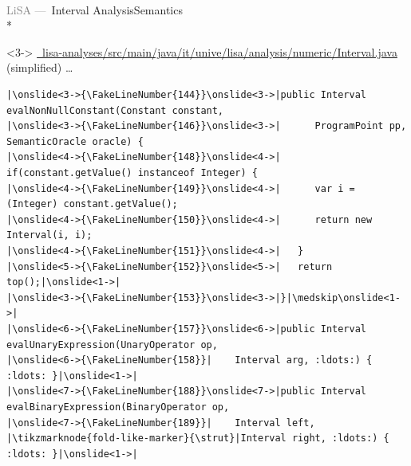 \begin{frame}[fragile]{\textcolor{gray}{LiSA ---~}Interval Analysis\textsuperscript{\color{gray}\smaller[2]\cite[p.\,389]{cousout2021principles}}\hfill Semantics}
\\*
\begin{uncoverenv}<3->
{\scriptsize\color{gray}\href{https://github.com/lisa-analyzer/lisa/blob/bd00779ab87e1cd31ed01b97d9b0e71b922f5bcf/lisa/lisa-analyses/src/main/java/it/unive/lisa/analysis/numeric/Interval.java}{\hbox{\faFileCodeO~}lisa-analyses/src/main/java/it/unive/lisa/analysis/numeric/Interval.java} (simplified)}
\preto\ldots{\color{lightgray}}%
\begin{verbatim}
|\onslide<3->{\FakeLineNumber{144}}\onslide<3->|public Interval evalNonNullConstant(Constant constant,
|\onslide<3->{\FakeLineNumber{146}}\onslide<3->|      ProgramPoint pp, SemanticOracle oracle) {
|\onslide<4->{\FakeLineNumber{148}}\onslide<4->|   if(constant.getValue() instanceof Integer) {
|\onslide<4->{\FakeLineNumber{149}}\onslide<4->|      var i = (Integer) constant.getValue();
|\onslide<4->{\FakeLineNumber{150}}\onslide<4->|      return new Interval(i, i);
|\onslide<4->{\FakeLineNumber{151}}\onslide<4->|   }
|\onslide<5->{\FakeLineNumber{152}}\onslide<5->|   return top();|\onslide<1->|
|\onslide<3->{\FakeLineNumber{153}}\onslide<3->|}|\medskip\onslide<1->|
|\onslide<6->{\FakeLineNumber{157}}\onslide<6->|public Interval evalUnaryExpression(UnaryOperator op,
|\onslide<6->{\FakeLineNumber{158}}|    Interval arg, :ldots:) { :ldots: }|\onslide<1->|
|\onslide<7->{\FakeLineNumber{188}}\onslide<7->|public Interval evalBinaryExpression(BinaryOperator op,
|\onslide<7->{\FakeLineNumber{189}}|    Interval left, |\tikzmarknode{fold-like-marker}{\strut}|Interval right, :ldots:) { :ldots: }|\onslide<1->|
\end{verbatim}
\endAnimateCode
\end{uncoverenv}
\end{frame}

